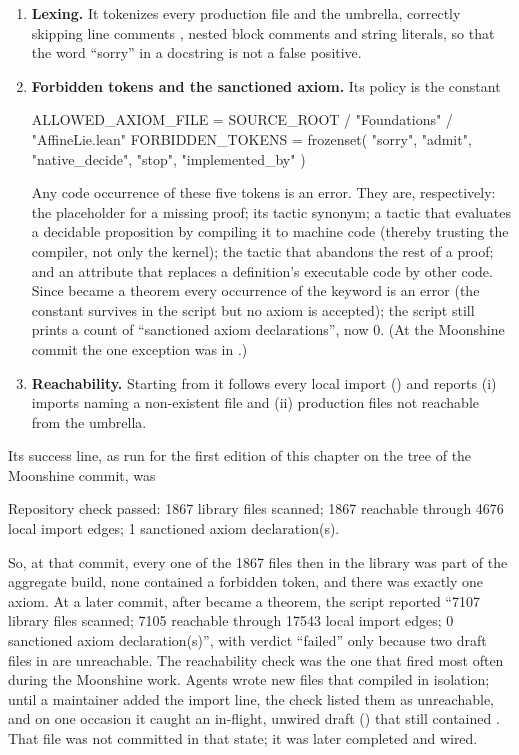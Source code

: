 \begin{enumerate}
\item \textbf{Lexing.} It tokenizes every production file  and the umbrella,
  correctly skipping line comments \lean{--}, nested block comments  and string
  literals, so that the word ``sorry'' in a docstring is not a false positive.
\item \textbf{Forbidden tokens and the sanctioned axiom.} Its policy is the constant
\begin{plaincode}
ALLOWED_AXIOM_FILE = SOURCE_ROOT / "Foundations" / "AffineLie.lean"
FORBIDDEN_TOKENS = frozenset(
    {"sorry", "admit", "native_decide", "stop", "implemented_by"}
)
\end{plaincode}
  Any code occurrence of these five tokens is an error. They are, respectively: the placeholder
  for a missing proof; its tactic synonym; a tactic that evaluates a decidable proposition by
  compiling it to machine code (thereby trusting the compiler, not only the kernel); the tactic
  that abandons the rest of a proof; and an attribute that replaces a definition's executable code
  by other code. Since  became a theorem every occurrence of the keyword  is
  an error (the constant  survives in the script but no axiom is
  accepted); the script still prints a count of ``sanctioned axiom declarations'', now 0. (At
  the Moonshine commit the one exception was  in .)
\item \textbf{Reachability.} Starting from  it follows every local import
  () and reports (i) imports naming a non-existent file and (ii) production
  files not reachable from the umbrella.
\end{enumerate}
Its success line, as run for the first edition of this chapter on the tree of the Moonshine commit, was
\begin{plaincode}
Repository check passed: 1867 library files scanned; 1867 reachable through 4676 local import edges; 1 sanctioned axiom declaration(s).
\end{plaincode}
So, at that commit, every one of the 1867 files then in the library was part of the aggregate build, none contained a
forbidden token, and there was exactly one axiom. At a later commit, after  became a theorem, the script reported ``7107
library files scanned; 7105 reachable through 17543 local import edges; 0 sanctioned axiom
declaration(s)'', with verdict ``failed'' only because two draft files in  are
unreachable. The reachability check was the one that fired most often during the
Moonshine work. Agents wrote new files that compiled in isolation; until a maintainer added the
import line, the check listed them as unreachable, and on one occasion it caught an in-flight,
unwired draft () that still contained
. That file was not committed in that state; it was later completed and wired.

